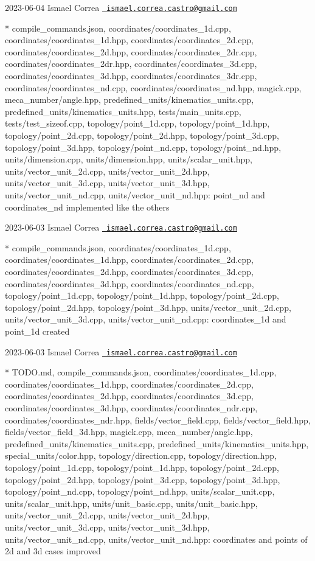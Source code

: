  2023-\/06-\/04 Ismael Correa \href{mailto:ismael.correa.castro@gmail.com}{\texttt{ ismael.\+correa.\+castro@gmail.\+com}} \begin{DoxyVerb}* compile_commands.json, coordinates/coordinates_1d.cpp,
coordinates/coordinates_1d.hpp, coordinates/coordinates_2d.cpp,
coordinates/coordinates_2d.hpp, coordinates/coordinates_2dr.cpp,
coordinates/coordinates_2dr.hpp, coordinates/coordinates_3d.cpp,
coordinates/coordinates_3d.hpp, coordinates/coordinates_3dr.cpp,
coordinates/coordinates_nd.cpp, coordinates/coordinates_nd.hpp,
magick.cpp, meca_number/angle.hpp,
predefined_units/kinematics_units.cpp,
predefined_units/kinematics_units.hpp, tests/main_units.cpp,
tests/test_sizeof.cpp, topology/point_1d.cpp,
topology/point_1d.hpp, topology/point_2d.cpp,
topology/point_2d.hpp, topology/point_3d.cpp,
topology/point_3d.hpp, topology/point_nd.cpp,
topology/point_nd.hpp, units/dimension.cpp, units/dimension.hpp,
units/scalar_unit.hpp, units/vector_unit_2d.cpp,
units/vector_unit_2d.hpp, units/vector_unit_3d.cpp,
units/vector_unit_3d.hpp, units/vector_unit_nd.cpp,
units/vector_unit_nd.hpp: point_nd and coordinates_nd implemented
like the others
\end{DoxyVerb}
 2023-\/06-\/03 Ismael Correa \href{mailto:ismael.correa.castro@gmail.com}{\texttt{ ismael.\+correa.\+castro@gmail.\+com}} \begin{DoxyVerb}* compile_commands.json, coordinates/coordinates_1d.cpp,
coordinates/coordinates_1d.hpp, coordinates/coordinates_2d.cpp,
coordinates/coordinates_2d.hpp, coordinates/coordinates_3d.cpp,
coordinates/coordinates_3d.hpp, coordinates/coordinates_nd.cpp,
topology/point_1d.cpp, topology/point_1d.hpp,
topology/point_2d.cpp, topology/point_2d.hpp,
topology/point_3d.hpp, units/vector_unit_2d.cpp,
units/vector_unit_3d.cpp, units/vector_unit_nd.cpp: coordinates_1d
and point_1d created
\end{DoxyVerb}
 2023-\/06-\/03 Ismael Correa \href{mailto:ismael.correa.castro@gmail.com}{\texttt{ ismael.\+correa.\+castro@gmail.\+com}} \begin{DoxyVerb}* TODO.md, compile_commands.json, coordinates/coordinates_1d.cpp,
coordinates/coordinates_1d.hpp, coordinates/coordinates_2d.cpp,
coordinates/coordinates_2d.hpp, coordinates/coordinates_3d.cpp,
coordinates/coordinates_3d.hpp, coordinates/coordinates_ndr.cpp,
coordinates/coordinates_ndr.hpp, fields/vector_field.cpp,
fields/vector_field.hpp, fields/vector_field_3d.hpp, magick.cpp,
meca_number/angle.hpp, predefined_units/kinematics_units.cpp,
predefined_units/kinematics_units.hpp, special_units/color.hpp,
topology/direction.cpp, topology/direction.hpp,
topology/point_1d.cpp, topology/point_1d.hpp,
topology/point_2d.cpp, topology/point_2d.hpp,
topology/point_3d.cpp, topology/point_3d.hpp,
topology/point_nd.cpp, topology/point_nd.hpp,
units/scalar_unit.cpp, units/scalar_unit.hpp, units/unit_basic.cpp,
units/unit_basic.hpp, units/vector_unit_2d.cpp,
units/vector_unit_2d.hpp, units/vector_unit_3d.cpp,
units/vector_unit_3d.hpp, units/vector_unit_nd.cpp,
units/vector_unit_nd.hpp: coordinates and points of 2d and 3d cases
improved
\end{DoxyVerb}
